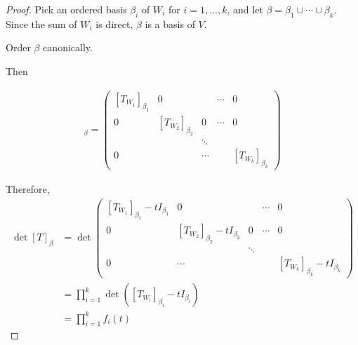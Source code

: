 \documentclass[11pt]{scrartcl}
\begin{document}
  \begin{proof}
    Pick an ordered basis $\beta_i$ of $W_i$ for $i=1, \dots, k$, and
    let $\beta = \beta_1\cup \cdots \cup \beta_{k}$. Since the sum of
    $W_{i}$ is direct, $\beta$ is a basis of $V$.

    Order $\beta$ canonically.

    Then

    \begin{align}
      [T]_{\beta} = 
      \begin{pmatrix}
        [T_{W_1}]_{\beta_1} & 0                   &        & \cdots & 0 \\
        0                   & [T_{W_2}]_{\beta_2} & 0      & \cdots & 0 \\
                            &                     & \ddots &        &   \\
        0                   &                     & \cdots &        & [T_{W_{k}}]_{\beta_{k}}
      \end{pmatrix}
    \end{align}


    Therefore,
    \begin{align}
      \det[T]_{\beta}                                                               & = 
                                              \det\begin{pmatrix}
                                                [T_{W_1}]_{\beta_1} - t I_{\beta_1} & 0                                   &        & \cdots & 0        \\
                                                0                                   & [T_{W_2}]_{\beta_2} - t I_{\beta_2} & 0      & \cdots & 0        \\
                                                                                    &                                     & \ddots &        &          \\
                                                0                                   & \cdots                              &        &        & [T_{W_{k}}]_{\beta_{k}} - t I_{\beta_k}
                                              \end{pmatrix}                                                                                            \\
                                                                                    & = \prod_{i=1}^{k}\det([T_{W_{i}}]_{\beta_{i}} - t I_{\beta_{i}}) \\
                                                                                    & 
                                                                                      =
                                                                                      \prod_{i=1}^{k}f_{i}(t)
    \end{align}
  \end{proof}
\end{document}
